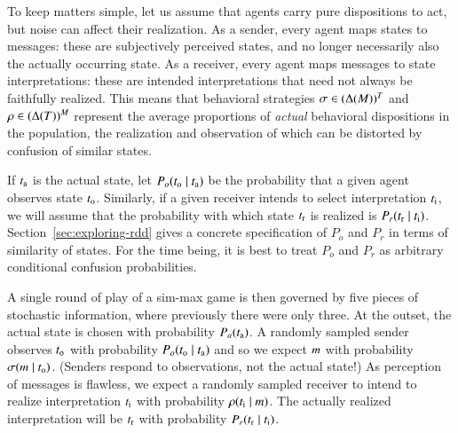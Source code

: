 \documentclass[fleqn,reqno,10pt]{article}
\begin{document}
To keep matters simple, let us assume that agents carry pure dispositions to act, but noise can
affect their realization. As a sender, every agent maps states to messages: these are
subjectively perceived states, and no longer necessarily also the actually occurring state. As
a receiver, every agent maps messages to state interpretations: these are intended
interpretations that need not always be faithfully realized. This means that behavioral
strategies $\sigma \in (\Delta(M))^T$ and $\rho \in (\Delta(T))^M$
represent the average proportions of \emph{actual} behavioral dispositions in the population,
the realization and observation of which can be distorted by confusion of similar states.

If $t_{\mathrm{a}}$ is the actual state, let $P_o(t_{\mathrm{o}} \mid t_{\mathrm{a}})$ be the
probability that a given agent observes state $t_{\mathrm{o}}$. Similarly, if a given receiver
intends to select interpretation $t_{\mathrm{i}}$, we will assume that the probability with which
state $t_{\mathrm{r}}$ is realized is $P_r(t_{\mathrm{r}} \mid
t_{\mathrm{i}})$.
Section~\ref{sec:exploring-rdd} gives a concrete specification of $P_o$ and $P_r$ in terms of
similarity of states. For the time being, it is best to treat $P_o$ and $P_r$ as arbitrary
conditional confusion probabilities.

A single round of play of a sim-max game is then governed by five pieces of stochastic
information, where previously there were only three. At the outset, the actual state is chosen
with probability $P_a(t_{\mathrm{a}})$. A randomly sampled sender observes $t_{\mathrm{o}}$ with
probability $P_o(t_{\mathrm{o}} \mid t_{\mathrm{a}})$ and so we expect $m$ with probability
$\sigma(m \mid t_{\mathrm{o}})$. (Senders respond to observations, not the actual
state!) As perception of messages is flawless, we expect a randomly sampled receiver to intend
to realize interpretation $t_{\mathrm{i}}$ with probability
$\rho(t_{\mathrm{i}} \mid m)$.  The actually realized interpretation will be
$t_{\mathrm{r}}$ with probability $P_r(t_{\mathrm{r}} \mid t_{\mathrm{i}})$.
\end{document}
